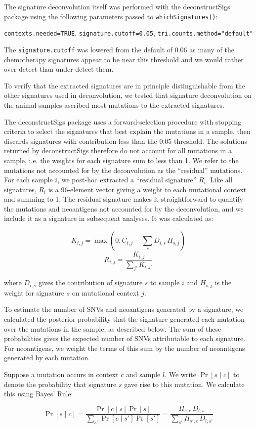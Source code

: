 The signature deconvolution itself was performed with the deconstructSigs\cite{Rosenthal_2016} package using the following parameters passed to \texttt{whichSignatures()}:

\texttt{contexts.needed=TRUE}, \texttt{signature.cutoff=0.05}, \texttt{tri.counts.method="default"}

The \texttt{signature.cutoff} was lowered from the default of $0.06$ as many of the chemotherapy signatures appear to be near this threshold and we would rather over-detect than under-detect them.

To verify that the extracted signatures are in principle distinguishable from the other signatures used in deconvolution, we tested that signature deconvolution on the animal samples ascribed most mutations to the extracted signatures.

The deconstructSigs package uses a forward-selection procedure with stopping criteria to select the signatures that best explain the mutations in a sample, then discards signatures with contribution less than the $0.05$ threshold. The solutions returned by deconstructSigs therefore do not account for all mutations in a sample, i.e. the weights for each signature sum to less than 1. We refer to the mutations not accounted for by the deconvolution as the ``residual'' mutations. For each sample $i$, we post-hoc extracted a ``residual signature'' $R_i$. Like all signatures, $R_i$ is a 96-element vector giving a weight to each mutational context and summing to 1. The residual signature makes it straightforward to quantify the mutations and neoantigens not accounted for by the deconvolution, and we include it as a signature in subsequent analyses. It was calculated as:

\[ K_{i,j} = \max(0, C_{i,j} - \sum_s{D_{i,s} \, H_{s, j}}) \]
\[ R_{i,j} = \frac{K_{i, j}}{\sum_{j'}{K_{i,j'}}} \]

where $D_{i,s}$ gives the contribution of signature $s$ to sample $i$ and $H_{s,j}$ is the weight for signature $s$ on mutational context $j$.

To estimate the number of SNVs and neoantigens generated by a signature, we calculated the posterior probability that the signature generated each mutation over the mutations in the sample, as described below. The sum of these probabilities gives the expected number of SNVs attributable to each signature. For neoantigens, we weight the terms of this sum by the number of neoantigens generated by each mutation.

Suppose a mutation occurs in context $c$ and sample $l$. We write $\Pr[s \mid c]$ to denote the probability that signature $s$ gave rise to this mutation. We calculate this using Bayes' Rule:

\[
\Pr[s \mid c] = \frac{\Pr[c \mid s] \Pr[s]}{\sum_{s'}{\Pr[c \mid s']\Pr[s']}} = \frac{H_{s,c} \, D_{l,s}}{\sum_{s'}{H_{s',c} \, D_{l,s'}}}
\]
